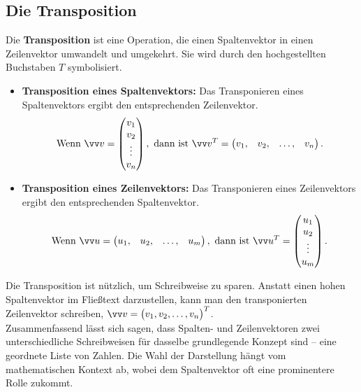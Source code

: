 \subsection*{Die Transposition}
Die \textbf{Transposition} ist eine Operation, die einen Spaltenvektor in einen Zeilenvektor umwandelt und umgekehrt. Sie wird durch den hochgestellten Buchstaben $T$ symbolisiert.
\begin{itemize}
    \item \textbf{Transposition eines Spaltenvektors:} Das Transponieren eines Spaltenvektors ergibt den entsprechenden Zeilenvektor.
    $$
    \text{Wenn } \ivec{v} = \begin{pmatrix} v_1 \\ v_2 \\ \vdots \\ v_n \end{pmatrix}, \text{ dann ist } \ivec{v}^T = \begin{pmatrix} v_1, & v_2, & \dots, & v_n \end{pmatrix}.
    $$
    \item \textbf{Transposition eines Zeilenvektors:} Das Transponieren eines Zeilenvektors ergibt den entsprechenden Spaltenvektor.
    $$
    \text{Wenn } \ivec{u} = \begin{pmatrix} u_1, & u_2, & \dots, & u_m \end{pmatrix}, \text{ dann ist } \ivec{u}^T = \begin{pmatrix} u_1 \\ u_2 \\ \vdots \\ u_m \end{pmatrix}.
    $$
\end{itemize}
Die Transposition ist nützlich, um Schreibweise zu sparen. Anstatt einen hohen Spaltenvektor im Fließtext darzustellen, kann man den transponierten Zeilenvektor schreiben, \zB $\ivec{v} = \begin{pmatrix} v_1, v_2, \dots, v_n \end{pmatrix}^T$.\\

Zusammenfassend lässt sich sagen, dass Spalten- und Zeilenvektoren zwei unterschiedliche Schreibweisen für dasselbe grundlegende Konzept sind -- eine geordnete Liste von Zahlen. Die Wahl der Darstellung hängt vom mathematischen Kontext ab, wobei dem Spaltenvektor oft eine prominentere Rolle zukommt. 



